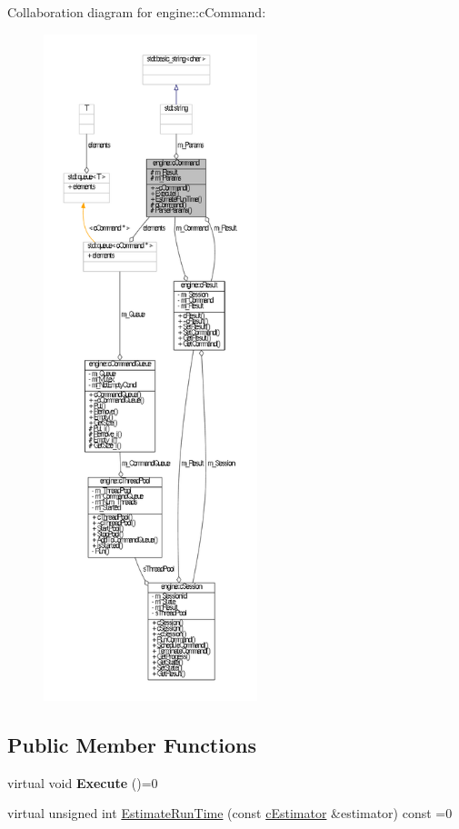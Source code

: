 \-Collaboration diagram for engine\-:\-:c\-Command\-:\nopagebreak
\begin{figure}[H]
\begin{center}
\leavevmode
\includegraphics[height=550pt]{classengine_1_1cCommand__coll__graph}
\end{center}
\end{figure}
\subsection*{\-Public \-Member \-Functions}
\begin{DoxyCompactItemize}
\item 
\hypertarget{classengine_1_1cCommand_a4c84c161b94f6ae36aec3661f951b54f}{virtual void {\bfseries \-Execute} ()=0}\label{classengine_1_1cCommand_a4c84c161b94f6ae36aec3661f951b54f}

\item 
virtual unsigned int \hyperlink{classengine_1_1cCommand_a8b5b45ad34530c454722a44e41ce9e78}{\-Estimate\-Run\-Time} (const \hyperlink{classengine_1_1cEstimator}{c\-Estimator} \&estimator) const =0
\end{DoxyCompactItemize}
